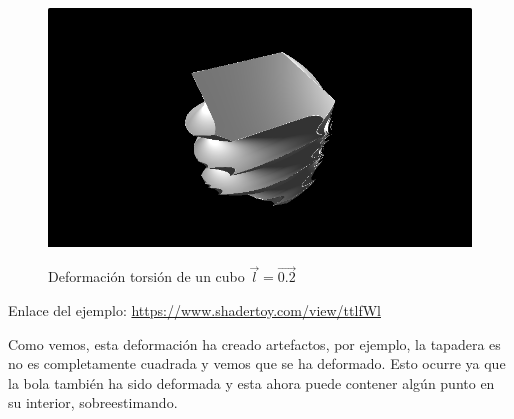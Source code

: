 \begin{figure}[H]
  \centering
  \captionsetup{justification=centering}%
  \includegraphics[width=1.0\textwidth]{secciones/imagenes/sdf/3d/sdf_twist.png}\label{fig:twist}
  \caption{Deformación torsión de un cubo \(\Vec{l}=\Vec{0.2}\)}
\end{figure}

Enlace del ejemplo:
\url{https://www.shadertoy.com/view/ttlfWl}

Como vemos, esta deformación ha creado artefactos, por ejemplo, la tapadera es no es completamente cuadrada y vemos que se ha deformado. Esto ocurre ya que la bola también ha sido deformada y esta ahora puede contener algún punto en su interior, sobreestimando.